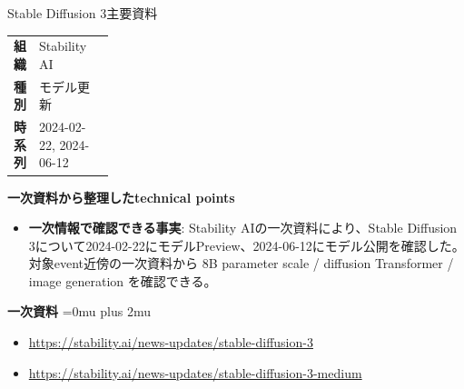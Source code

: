\Needspace{0.38\textheight}
\begin{technicalnote}{Stable Diffusion 3}{主要資料}
\begingroup
\begin{tabularx}{\linewidth}{@{}>{\bfseries}p{0.22\linewidth}X@{}}
組織 & Stability AI \\
種別 & モデル更新 \\
時系列 & 2024-02-22, 2024-06-12 \\
\end{tabularx}
\smallskip
\begin{minipage}{\linewidth}
{\bfseries 一次資料から整理したtechnical points}
\begin{itemize}[leftmargin=1.5em,itemsep=0.35em]
\item \textbf{一次情報で確認できる事実}: Stability AIの一次資料により、Stable Diffusion 3について2024-02-22にモデルPreview、2024-06-12にモデル公開を確認した。 対象event近傍の一次資料から 8B parameter scale / diffusion Transformer / image generation を確認できる。
\end{itemize}
\begin{minipage}{\linewidth}
\begin{samepage}
{\bfseries 一次資料}
\begingroup\sloppy
\Urlmuskip=0mu plus 2mu\relax
\begin{itemize}[leftmargin=1.5em,itemsep=0.25em]
\item {\scriptsize\url{https://stability.ai/news-updates/stable-diffusion-3}}
\item {\scriptsize\url{https://stability.ai/news-updates/stable-diffusion-3-medium}}
\end{itemize}
\endgroup
\end{samepage}
\end{minipage}
\end{minipage}
\endgroup
\end{technicalnote}
\medskip

